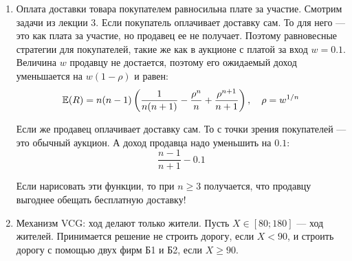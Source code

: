 \begin{enumerate}
\begin{figure}
\hfill
{}
\hfill
{}
\hfill
\end{figure}

\item Оплата доставки товара покупателем равносильна плате за участие. Смотрим задачи из лекции 3. Если покупатель оплачивает доставку сам. То для него --- это как плата за участие, но продавец ее не получает. Поэтому равновесные стратегии для покупателей, такие же как в аукционе с платой за вход $ w=0.1 $. Величина $ w $ продавцу не достается, поэтому его ожидаемый доход уменьшается на $ w(1-\rho) $ и равен:
\begin{equation}
\mathbb{E}(R)=n(n-1)\left(\frac{1}{n(n+1)}-\frac{\rho^{n}}{n}+\frac{\rho^{n+1}}{n+1}\right),\quad \rho=w^{1/n}
\end{equation}


Если же продавец оплачивает доставку сам. То с точки зрения покупателей --- это обычный аукцион. А доход продавца надо уменьшить на $ 0.1 $:
\begin{equation}
\frac{n-1}{n+1}-0.1
\end{equation}

Если нарисовать эти функции, то при $ n\geq 3 $ получается, что продавцу выгоднее обещать бесплатную доставку!

\item Механизм VCG: ход делают только жители. Пусть $ X\in[80;180]$ --- ход жителей. Принимается решение не строить дорогу, если $ X<90 $, и строить дорогу с помощью двух фирм Б1 и Б2, если $ X\geq 90 $.


\end{enumerate}
